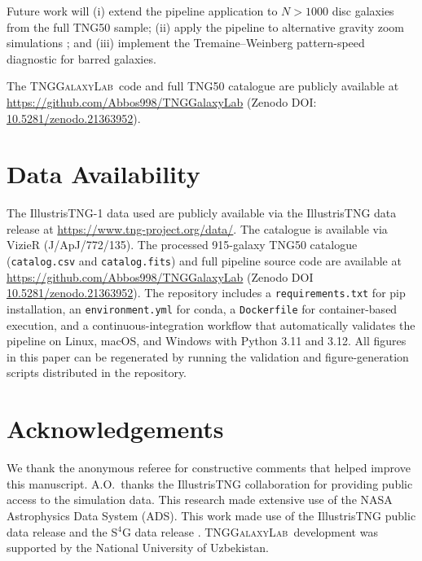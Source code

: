 \documentclass[fleqn,usenatbib]{mnras}
\newcommand{\pipeline}{\textsc{TNGGalaxyLab}}
\begin{document}
Future work will (i) extend the pipeline application to $N > 1000$
disc galaxies from the full TNG50 sample; (ii) apply the pipeline
to alternative gravity zoom simulations
\citep[e.g.][]{}; and (iii) implement
the Tremaine--Weinberg pattern-speed diagnostic
\citep{1984ApJ...282L...5T} for barred galaxies.

The \pipeline\ code and full TNG50 catalogue are publicly
available at
\url{https://github.com/Abbos998/TNGGalaxyLab}
(Zenodo DOI: \href{https://doi.org/10.5281/zenodo.21363952}{10.5281/zenodo.21363952}).


\section*{Data Availability}

The IllustrisTNG-1 data used are publicly available via the
IllustrisTNG data release \citep{2019ComAC...6....2N} at
\url{https://www.tng-project.org/data/}.  The
\citet{2013ApJ...772..135Z} catalogue is available via VizieR
(J/ApJ/772/135).  The processed 915-galaxy TNG50 catalogue
(\texttt{catalog.csv} and \texttt{catalog.fits}) and full pipeline
source code are available at
\url{https://github.com/Abbos998/TNGGalaxyLab}
(Zenodo DOI \href{https://doi.org/10.5281/zenodo.21363952}{10.5281/zenodo.21363952}).  The repository includes a
\texttt{requirements.txt} for pip installation, an
\texttt{environment.yml} for conda, a \texttt{Dockerfile} for
container-based execution, and a continuous-integration workflow
that automatically validates the pipeline on Linux, macOS, and
Windows with Python 3.11 and 3.12.  All figures in this paper can
be regenerated by running the validation and figure-generation
scripts distributed in the repository.


\section*{Acknowledgements}

We thank the anonymous referee for constructive comments that helped improve this manuscript.  A.O.\ thanks the IllustrisTNG collaboration for providing public access to the simulation data.  This research made extensive use of the NASA Astrophysics Data System (ADS).
This work made use of the IllustrisTNG public data release
\citep{2019ComAC...6....2N} and the S$^{4}$G data release
\citep{2010PASP..122.1397S,2015ApJS..217...32B}.  \pipeline\ development was supported by the
National University of Uzbekistan.
\end{document}
